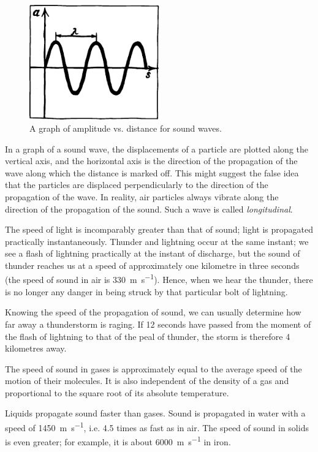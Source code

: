 \begin{figure}[!ht]
\centering
\includegraphics[width=0.5\textwidth]{figures/fig-06-12.pdf}
\caption{A graph of amplitude vs. distance for sound waves.}
\label{fig-6.12}
\end{figure}

In a graph of a sound wave, the displacements of a particle are plotted along the vertical axis, and the hor­izontal axis is the direction of the propagation of the wave along which the distance is marked off. This might suggest the false idea that the particles are displaced per­pendicularly to the direction of the propagation of the wave. In reality, air particles always vibrate along the direction of the propagation of the sound. Such a wave is called \emph{longitudinal}.

The speed of light is incomparably greater than that of sound; light is propagated practically instantaneously. Thunder and lightning occur at the same instant; we see a flash of lightning practically at the instant of discharge, but the sound of thunder reaches us at a speed of approx­imately one kilometre in three seconds (the speed of sound in air is \SI{330}{\meter\per\second}). Hence, when we hear the thunder, there is no longer any danger in being struck by that par­ticular bolt of lightning.

Knowing the speed of the propagation of sound, we can usually determine how far away a thunderstorm is raging. If 12 seconds have passed from the moment of the flash of lightning to that of the peal of thunder, the storm is therefore 4 kilometres away.

The speed of sound in gases is approximately equal to the average speed of the motion of their molecules. It is also independent of the density of a gas and proportional to the square root of its absolute temperature. 

Liquids propagate sound faster than gases. Sound is propagated in water with a speed of \SI{1450}{\meter\per\second}, i.e. 4.5 times as fast as in air. The speed of sound in solids is even greater; for exam­ple, it is about \SI{6000}{\meter\per\second} in iron.

